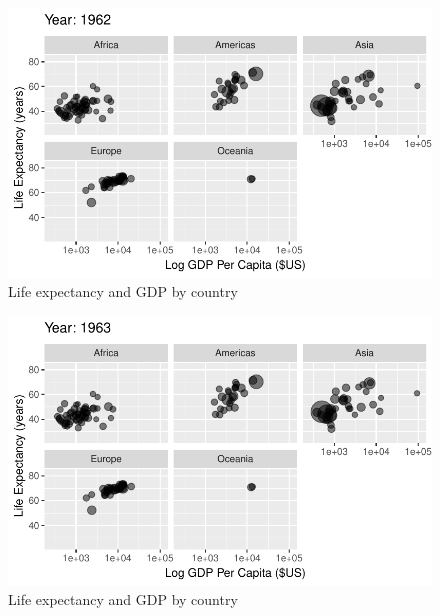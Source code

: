 \documentclass[
  letterpaper,
  DIV=11,
  numbers=noendperiod]{scrreport}
\theoremstyle{definition}
\theoremstyle{remark}
\begin{document}
\begin{figure}

{\centering \includegraphics{index_files/figure-pdf/fig-anim-lifegdp-19.pdf}

}

\caption{\label{fig-anim-lifegdp-19}Life expectancy and GDP by country}

\end{figure}

\begin{figure}

{\centering \includegraphics{index_files/figure-pdf/fig-anim-lifegdp-20.pdf}

}

\caption{\label{fig-anim-lifegdp-20}Life expectancy and GDP by country}

\end{figure}
\end{document}
